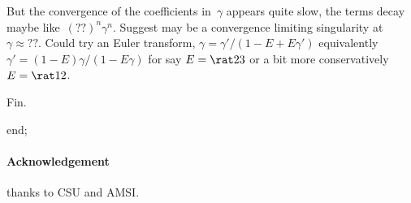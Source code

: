 \documentclass[12pt,a5paper]{article}
\begin{document}
But the convergence of the coefficients in~\(\gamma\) appears quite slow, the terms decay maybe like~\((??)^n\gamma^n\). 
Suggest may be a convergence limiting singularity at \(\gamma\approx ??\).
Could try an Euler transform, \(\gamma=\gamma'/(1-E+E\gamma')\) equivalently \(\gamma'=(1-E)\gamma/(1-E\gamma)\) for say \(E=\rat23\) or a bit more conservatively \(E=\rat12\).


Fin.
\begin{reduce}
end;
\end{reduce}

\paragraph{Acknowledgement} thanks to CSU and AMSI.



\end{document}

